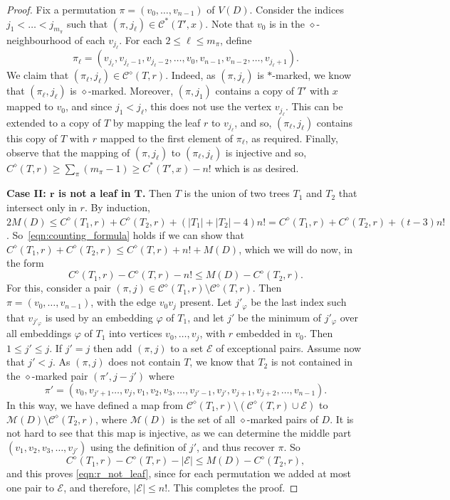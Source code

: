 \documentclass[11pt]{article}
\numberwithin{equation}{section}
\renewcommand{\leq}{\leqslant}
\let\phi=\varphi
\theoremstyle{definition}
\begin{document}
\begin{proof}
Fix a permutation $\pi = (v_0,\dots,v_{n-1})$ of $V(D)$. Consider the indices $j_1<\dots<j_{m_\pi}$ such that $(\pi,j_\ell)\in \mathcal C^\ast(T',x)$.
Note that $v_0$ is in the $\diamond$-neighbourhood of each $v_{j_\ell}$. For each $2\leq \ell\leq m_\pi$, define
\begin{equation*}
    \pi_\ell = (v_{j_\ell}, v_{j_\ell-1}, v_{j_\ell-2},\dots,v_{0}, v_{n-1},v_{n-2},\dots,v_{j_\ell +1}).
\end{equation*}
We claim that $(\pi_\ell,j_{\ell})\in\mathcal C^\diamond(T,r)$. Indeed, as $(\pi, j_\ell)$ is $\ast$-marked, we know that $(\pi_\ell,j_\ell)$ is $\diamond$-marked. 
Moreover, $(\pi,j_1)$ contains a copy of $T'$ with $x$ mapped to $v_0$, and since $j_1<j_\ell$, this does not use the vertex $v_{j_\ell}$. This can be extended to a copy of $T$ by mapping the leaf $r$ to $v_{j_\ell}$, and so, $(\pi_\ell,j_\ell)$ contains this copy of $T$ with $r$ mapped to the first element of $\pi_\ell$, as required.
Finally, observe that the mapping of $(\pi,j_\ell)$ to $(\pi_\ell,j_\ell)$ is injective and so, $C^\diamond(T,r)\ge\sum_\pi(m_\pi-1)\ge C^\ast(T',x)-n!$ which is as desired.

\textbf{Case II: $\boldsymbol{r}$ is not a leaf in $\boldsymbol{T}$. } Then $T$ is the union of two trees $T_1$ and $T_2$ that intersect only in $r$. By induction, $2M(D)\le C^\diamond(T_1, r)+C^\diamond(T_2,r)+(|T_1|+|T_2|-4)n!=C^\diamond(T_1, r)+C^\diamond(T_2,r)+(t-3)n!$. So~\eqref{eqn:counting_formula} holds if we can show that $C^\diamond ( T_1, r)+C^\diamond(T_2,r)\le C^\diamond(T,r)+n!+M(D)$, which we will do now, in the form
\begin{equation}\label{eqn:r_not_leaf}
    C^\diamond ( T_1, r) - C^\diamond(T,r)-n!\le 
M(D)
-C^\diamond(T_2,r).
\end{equation}
For this, consider a pair $(\pi, j)\in\mathcal C^\diamond(T_1,r)\setminus\mathcal C^\diamond(T,r)$. 
Then $\pi=(v_{0},\dots, v_{{n-1}})$, with the edge $v_0v_{j}$ present. Let $j'_\phi$ be the last index such that $v_{j'_\phi}$ is used by  an embedding $\phi$ of $T_1$, and let $j'$ be the minimum of $j'_\phi$ over all embeddings $\phi$ of $T_1$ into vertices $v_0,\dots,v_j$, with $r$ embedded in $v_0$. Then $1\le j'\le j$. If $j'=j$ then add $(\pi,j)$ to a set $\mathcal E$ of exceptional pairs. Assume now that $j'<j$.  As $(\pi, j)$ does not contain $T$, we know that $T_2$ is not contained in the $\diamond$-marked pair $(\pi',j-j')$ where $$\pi'=(v_{0},v_{j'+1}\dots, v_j, v_1,v_2, v_3,\dots, v_{j'-1},v_{j'},v_{j+1},v_{j+2},\dots, v_{{n-1}}).$$
In this way, we have defined a map from  $\mathcal C^\diamond(T_1,r)\setminus (\mathcal C^\diamond(T,r)\cup\mathcal E)$ to $\mathcal M(D)\setminus \mathcal C^\diamond(T_2,r)$, where $\mathcal M(D)$ is the set of all $\diamond$-marked pairs of $D$. It is not hard to see that this map is injective, as we can determine the middle part $(v_1,v_2,v_3,\dots,v_{j'})$ using the definition of $j'$, and thus recover $\pi$. So
\[
C^\diamond(T_1,r)- C^\diamond(T,r)-|\mathcal E|\le M(D) -C^\diamond(T_2,r),
\]
and this proves \eqref{eqn:r_not_leaf}, since for each permutation we added at most one pair to $\mathcal E$, and therefore, $|\mathcal E|\le n!$. This completes the proof.
\end{proof}
\end{document}
